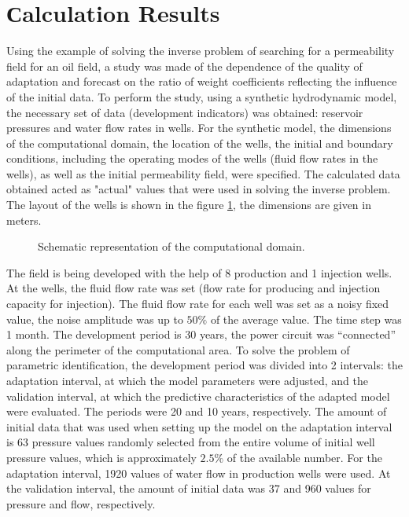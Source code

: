 \documentclass[
11pt,%
tightenlines,%
twoside,%
onecolumn,%
nofloats,%
nobibnotes,%
nofootinbib,%
superscriptaddress,%
noshowpacs,%
centertags]%
{revtex4}
\begin{document}
\section{Сalculation Results}
Using the example of solving the inverse problem of searching for a permeability field for an oil field, a study was made of the dependence of the quality of adaptation and forecast on the ratio of weight coefficients reflecting the influence of the initial data. To perform the study, using a synthetic hydrodynamic model, the necessary set of data (development indicators) was obtained: reservoir pressures and water flow rates in wells. For the synthetic model, the dimensions of the computational domain, the location of the wells, the initial and boundary conditions, including the operating modes of the wells (fluid flow rates in the wells), as well as the initial permeability field, were specified. The calculated data obtained acted as "actual" values that were used in solving the inverse problem. The layout of the wells is shown in the figure \ref{fig:map}, the dimensions are given in meters.
\begin{figure}
    \caption{Schematic representation of the computational domain.}
	\label{fig:map}
\end{figure}

The field is being developed with the help of 8 production and 1 injection wells. At the wells, the fluid flow rate was set (flow rate for producing and injection capacity for injection). The fluid flow rate for each well was set as a noisy fixed value, the noise amplitude was up to $50\%$ of the average value. The time step was 1 month. The development period is 30 years, the power circuit was “connected” along the perimeter of the computational area. To solve the problem of parametric identification, the development period was divided into 2 intervals: the adaptation interval, at which the model parameters were adjusted, and the validation interval, at which the predictive characteristics of the adapted model were evaluated. The periods were 20 and 10 years, respectively. The amount of initial data that was used when setting up the model on the adaptation interval is 63 pressure values randomly selected from the entire volume of initial well pressure values, which is approximately $2.5\%$ of the available number. For the adaptation interval, 1920 values of water flow in production wells were used. At the validation interval, the amount of initial data was 37 and 960 values for pressure and flow, respectively.
\end{document}
